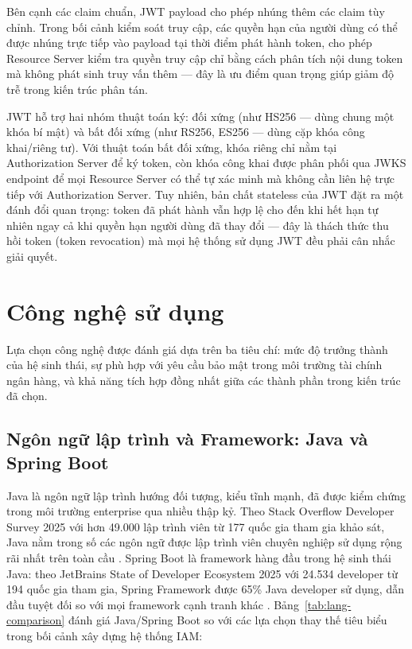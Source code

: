 \documentclass[../DoAn.tex]{subfiles}
\begin{document}
Bên cạnh các claim chuẩn, JWT payload cho phép nhúng thêm các claim tùy chỉnh. Trong bối cảnh kiểm soát truy cập, các quyền hạn của người dùng có thể được nhúng trực tiếp vào payload tại thời điểm phát hành token, cho phép Resource Server kiểm tra quyền truy cập chỉ bằng cách phân tích nội dung token mà không phát sinh truy vấn thêm — đây là ưu điểm quan trọng giúp giảm độ trễ trong kiến trúc phân tán.

JWT hỗ trợ hai nhóm thuật toán ký: đối xứng (như HS256 — dùng chung một khóa bí mật) và bất đối xứng (như RS256, ES256 — dùng cặp khóa công khai/riêng tư). Với thuật toán bất đối xứng, khóa riêng chỉ nằm tại Authorization Server để ký token, còn khóa công khai được phân phối qua JWKS endpoint để mọi Resource Server có thể tự xác minh mà không cần liên hệ trực tiếp với Authorization Server. Tuy nhiên, bản chất stateless của JWT đặt ra một đánh đổi quan trọng: token đã phát hành vẫn hợp lệ cho đến khi hết hạn tự nhiên ngay cả khi quyền hạn người dùng đã thay đổi — đây là thách thức thu hồi token (token revocation) mà mọi hệ thống sử dụng JWT đều phải cân nhắc giải quyết.

\section{Công nghệ sử dụng}
\label{section:3.2}

Lựa chọn công nghệ được đánh giá dựa trên ba tiêu chí: mức độ trưởng thành của hệ sinh thái, sự phù hợp với yêu cầu bảo mật trong môi trường tài chính ngân hàng, và khả năng tích hợp đồng nhất giữa các thành phần trong kiến trúc đã chọn.

\subsection{Ngôn ngữ lập trình và Framework: Java và Spring Boot}
\label{subsection:3.2.1}

Java là ngôn ngữ lập trình hướng đối tượng, kiểu tĩnh mạnh, đã được kiểm chứng trong môi trường enterprise qua nhiều thập kỷ. Theo Stack Overflow Developer Survey 2025 với hơn 49.000 lập trình viên từ 177 quốc gia tham gia khảo sát, Java nằm trong số các ngôn ngữ được lập trình viên chuyên nghiệp sử dụng rộng rãi nhất trên toàn cầu \cite{stackoverflow_survey_2025}. Spring Boot là framework hàng đầu trong hệ sinh thái Java: theo JetBrains State of Developer Ecosystem 2025 với 24.534 developer từ 194 quốc gia tham gia, Spring Framework được 65\% Java developer sử dụng, dẫn đầu tuyệt đối so với mọi framework cạnh tranh khác \cite{jetbrains_deveco_2025}. Bảng~\ref{tab:lang-comparison} đánh giá Java/Spring Boot so với các lựa chọn thay thế tiêu biểu trong bối cảnh xây dựng hệ thống IAM:
\end{document}
